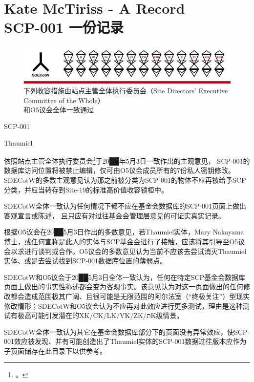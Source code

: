 \chapter[SCP-001 一份记录]{
	Kate McTiriss - A Record \\
	SCP-001 一份记录
}

\label{chap:SCP-001.a.record}

\begin{figure}[H]
	\centering
	\includegraphics[width=\linewidth]{images/SCP-001-a-record.png}
	\caption*{下列收容措施由站点主管全体执行委员会（Site Directors' Executive Committee of the Whole）\\ 和O5议会全体一致通过}
\end{figure}

SCP-001

Thaumiel

依照站点主管全体执行委员会\footnote{。}于20██年5月3日一致作出的主观意见， SCP-001的数据库访问位置将被禁止编辑，仅可由O5议会成员所有的7份私人密钥修改。SDECotW的多数主观意见认为那之前被分类为SCP-001的物体不应再被给予SCP分类，并应当转存到Site-19的标准高价值收容锁柜中。

SDECotW全体一致认为任何情况下都不应在基金会数据库的SCP-001页面上做出客观宣言或陈述， 且只应有对过往基金会管理层意见的可证实真实记录。

根据O5议会在20██5月3日作出的多数意见，若Thaumiel实体，Mary Nakayama博士，或任何宣称是此人的实体与SCP基金会进行了接触，应该将其引导至O5议会以求进行谈判或合作。O5议会的多数意见认为当前不应该去尝试消灭Thaumiel实体、或是去尝试找到SCP-001数据库位置的薄弱点。

SDECotW和O5议会于20██5月3日全体一致认为，任何在特定SCP基金会数据库页面上做出的事实性称述都会变为客观事实。该意见认为对这一页面做出的任何修改都会造成范围极其广阔、且很可能是无限范围的阿尔法室（“终极关注”）型现实修改情形；SDECotW和O5议会认为不应再对此效应进行更多测试，理由是这种测试有极高可能引发潜在的XK/CK/LK/VK/ZK/תK级情景。

SDECotW全体一致认为其它在基金会数据库部分下的页面没有异常效应，使SCP-001效应被发现、并有可能创造出了Thaumiel实体的SCP-001数据过往版本应作为子页面储存在此目录下以供参考。

